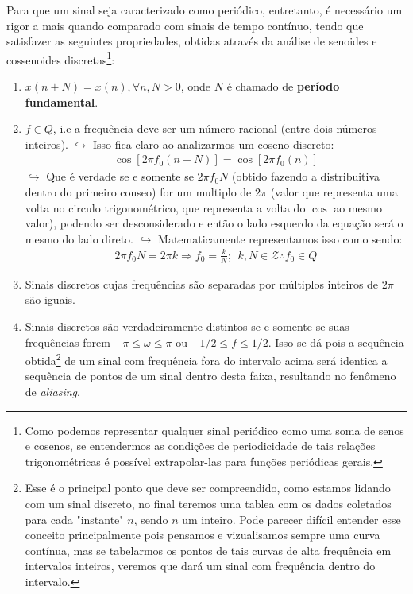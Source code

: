 \documentclass{article}
\begin{document}
Para que um sinal seja caracterizado como periódico, entretanto, é necessário um rigor a mais quando comparado com sinais de tempo contínuo, tendo que satisfazer as seguintes propriedades, obtidas através da análise de senoides e cossenoides discretas\footnote{Como podemos representar qualquer sinal periódico como uma soma de senos e cosenos, se entendermos as condições de periodicidade de tais relações trigonométricas é possível extrapolar-las para funções periódicas gerais.}:
\begin{enumerate}
    \item $x(n+N) = x(n), \forall n, N>0$, onde $N$ é chamado de \textbf{período fundamental}.
    \item $f \in Q$, i.e a frequência deve ser um número racional (entre dois números inteiros).
    \subitem $\hookrightarrow$ Isso fica claro ao analizarmos um coseno discreto:
    \begin{align*}
        \cos[2\pi f_0 (n+N)] = \cos[2\pi f_0 (n)]
    \end{align*}
    \subitem $\hookrightarrow$ Que é verdade se e somente se $2\pi f_0 N$ (obtido fazendo a distribuitiva dentro do primeiro conseo) for um multiplo de $2\pi$ (valor que representa uma volta no circulo trigonométrico, que representa a volta do $\cos$ ao mesmo valor), podendo ser desconsiderado e então o lado esquerdo da equação será o mesmo do lado direto.
    \subitem $\hookrightarrow$ Matematicamente representamos isso como sendo:
    \begin{align}
        2\pi f_0 N = 2\pi k \Rightarrow f_0 = \frac{k}{N}; \ \ k,N \in \mathcal{Z} \therefore f_0 \in Q
        \label{eq:periodo_fund_disc}
    \end{align}

    \item Sinais discretos cujas frequências são separadas por múltiplos inteiros de $2\pi$ são iguais.
    
    \item Sinais discretos são verdadeiramente distintos se e somente se suas frequências forem $-\pi \leq \omega \leq \pi$ ou $-1/2 \leq f \leq 1/2$. Isso se dá pois a sequência obtida\footnote{Esse é o principal ponto que deve ser compreendido, como estamos lidando com um sinal discreto, no final teremos uma tablea com os dados coletados para cada "instante" $n$, sendo $n$ um inteiro. Pode parecer difícil entender esse conceito principalmente pois pensamos e vizualisamos sempre uma curva contínua, mas se tabelarmos os pontos de tais curvas de alta frequência em intervalos inteiros, veremos que dará um sinal com frequência dentro do intervalo.} de um sinal com frequência fora do intervalo acima será identica a sequência de pontos de um sinal dentro desta faixa, resultando no fenômeno de \emph{aliasing}.
\end{enumerate}
\end{document}
